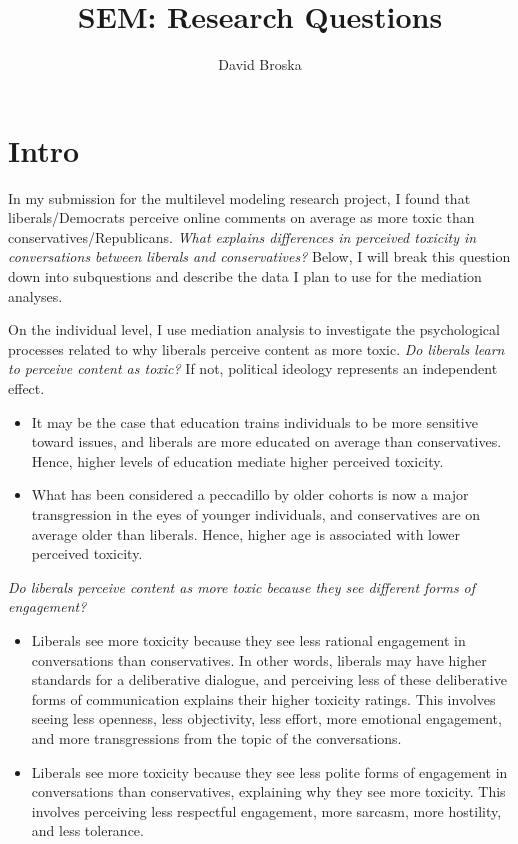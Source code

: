 \documentclass{article}
\title{SEM: Research Questions}
\author[1]{David Broska}
\begin{document}
\maketitle

\section{Intro}

In my submission for the multilevel modeling research project, I found that liberals/Democrats perceive online comments on average as more toxic than conservatives/Republicans. \textit{What explains differences in perceived toxicity in conversations between liberals and conservatives?} Below, I will break this question down into subquestions and describe the data I plan to use for the mediation analyses.


On the individual level, I use mediation analysis to investigate the psychological processes related to why liberals perceive content as more toxic. \textit{Do liberals learn to perceive content as toxic?} If not, political ideology represents an independent effect.

\begin{itemize}
    \item It may be the case that education trains individuals to be more sensitive toward issues, and liberals are more educated on average than conservatives. Hence, higher levels of education mediate higher perceived toxicity. 
    \item What has been considered a peccadillo by older cohorts is now a major transgression in the eyes of younger individuals, and conservatives are on average older than liberals. Hence, higher age is associated with lower perceived toxicity. 
\end{itemize}


\textit{Do liberals perceive content as more toxic because they see different forms of engagement?}

\begin{itemize}
    \item Liberals see more toxicity because they see less rational engagement in conversations than conservatives. In other words, liberals may have higher standards for a deliberative dialogue, and perceiving less of these deliberative forms of communication explains their higher toxicity ratings. This involves seeing less openness, less objectivity, less effort, more emotional engagement, and more transgressions from the topic of the conversations.
    \item Liberals see more toxicity because they see less polite forms of engagement in conversations than conservatives, explaining why they see more toxicity. This involves perceiving less respectful engagement, more sarcasm, more hostility, and less tolerance. 
\end{itemize}
\end{document}
